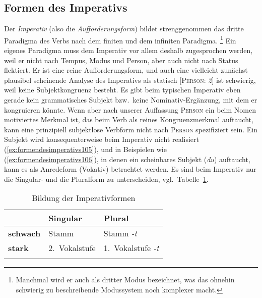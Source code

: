 \subsection{Formen des Imperativs}
\label{sec:formendesimperativs}


Der \textit{Imperativ} (also die \textit{Aufforderungsform}) bildet strenggenommen das dritte Paradigma des Verbs nach dem finiten und dem infiniten Paradigma.%
\footnote{Manchmal wird er auch als dritter Modus bezeichnet, was das ohnehin schwierig zu beschreibende Modussystem noch komplexer macht.}
Ein eigenes Paradigma muss dem Imperativ vor allem deshalb zugesprochen werden, weil er nicht nach Tempus, Modus und Person, aber auch nicht nach Status flektiert.
Er ist eine reine Aufforderungsform, und auch eine vielleicht zunächst plausibel scheinende Analyse des Imperativs als statisch [\textsc{Person}: \textit{2}] ist schwierig, weil keine Subjektkongruenz besteht.
Es gibt beim typischen Imperativ eben gerade kein grammatisches Subjekt bzw.\ keine Nominativ-Ergänzung, mit dem er kongruieren könnte.
Wenn aber nach unserer Auffassung \textsc{Person} ein beim Nomen motiviertes Merkmal ist, das beim Verb als reines Kongruenzmerkmal auftaucht, kann eine prinzipiell subjektlose Verbform nicht nach \textsc{Person} spezifiziert sein.
Ein Subjekt wird konsequenterweise beim Imperativ nicht realisiert (\ref{ex:formendesimperativs105}), und in Beispielen wie (\ref{ex:formendesimperativs106}), in denen ein scheinbares Subjekt (\textit{du}) auftaucht, kann es als Anredeform (Vokativ) betrachtet werden.
Es sind beim Imperativ nur die Singular- und die Pluralform zu unterscheiden, vgl.\ Tabelle~\ref{tab:formendesimperativs107}.

\begin{exe}
  \ex\label{ex:formendesimperativs104}
  \begin{xlist}
  \end{xlist}
\end{exe}


\begin{table}[!htbp]
  \centering
  \begin{tabular}{lll}
    \lsptoprule
    & \textbf{Singular} & \textbf{Plural} \\
    \midrule
    \textbf{schwach} & Stamm & Stamm \textit{-t} \\
    \textbf{stark} & 2.~Vokalstufe & 1.~Vokalstufe \textit{-t} \\
    \lspbottomrule
  \end{tabular}
  \caption{Bildung der Imperativformen}
  \label{tab:formendesimperativs107}
\end{table}

